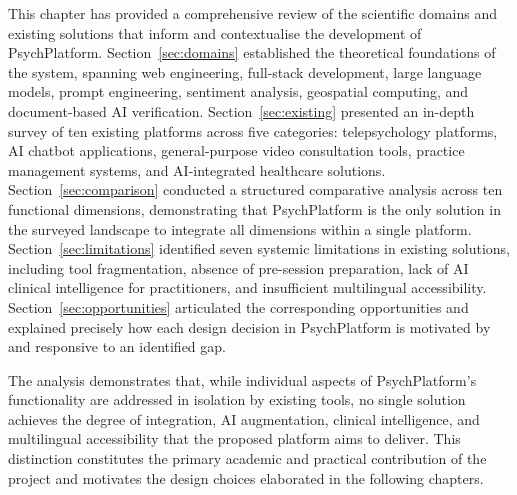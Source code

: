 \begin{mdframed}[backgroundcolor=lightgray, linecolor=accentblue, linewidth=1.5pt,
                 topline=true, bottomline=true, leftline=false, rightline=false,
                 innertopmargin=10pt, innerbottommargin=10pt]
This chapter has provided a comprehensive review of the scientific domains and
existing solutions that inform and contextualise the development of PsychPlatform.
Section~\ref{sec:domains} established the theoretical foundations of the system,
spanning web engineering, full-stack development, large language models, prompt
engineering, sentiment analysis, geospatial computing, and document-based AI
verification. Section~\ref{sec:existing} presented an in-depth survey of ten
existing platforms across five categories: telepsychology platforms, AI chatbot
applications, general-purpose video consultation tools, practice management
systems, and AI-integrated healthcare solutions. Section~\ref{sec:comparison}
conducted a structured comparative analysis across ten functional dimensions,
demonstrating that PsychPlatform is the only solution in the surveyed landscape
to integrate all dimensions within a single platform. Section~\ref{sec:limitations}
identified seven systemic limitations in existing solutions, including tool
fragmentation, absence of pre-session preparation, lack of AI clinical intelligence
for practitioners, and insufficient multilingual accessibility.
Section~\ref{sec:opportunities} articulated the corresponding opportunities and
explained precisely how each design decision in PsychPlatform is motivated by and
responsive to an identified gap.

The analysis demonstrates that, while individual aspects of PsychPlatform's
functionality are addressed in isolation by existing tools, no single solution
achieves the degree of integration, AI augmentation, clinical intelligence, and
multilingual accessibility that the proposed platform aims to deliver. This
distinction constitutes the primary academic and practical contribution of the
project and motivates the design choices elaborated in the following chapters.
\end{mdframed}

